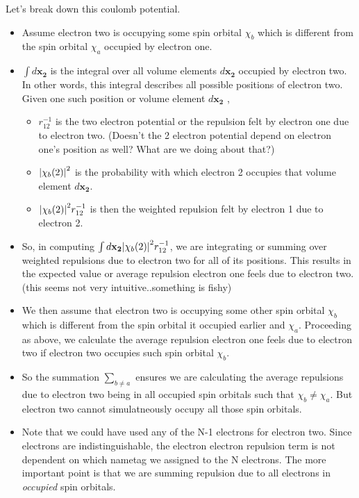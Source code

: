 \documentclass{article}
\begin{document}
        Let's break down this coulomb potential.
        \begin{itemize}
          \item Assume electron two is occupying some spin orbital \(\chi_b\) which is
          different from the spin orbital \(\chi_a\) occupied by electron one.
          \item \(\int d\mathbf{x_2}\) is the integral over all
          volume elements \(d\mathbf{x_2}\) occupied by electron two. In other words,
          this integral describes all possible positions of electron two. Given one
          such position or volume element \(d\mathbf{x_2}\) ,
          \begin{itemize}
            \item \(r_{1 2}^{-1}\) is the two electron potential or the repulsion felt
            by electron one due to electron two. (Doesn't the 2 electron potential
            depend on electron one's position as well? What are we doing about that?)
            \item \(\abs{\chi_b(2)}^2\) is the probability with which electron 2 occupies
            that volume element \(d\mathbf{x_2}\).
            \item \(\abs{\chi_b(2)}^2 r_{1 2}^{-1}\) is then the weighted repulsion felt by
            electron 1 due to electron 2.
          \end{itemize}
          \item So, in computing \(\int d\mathbf{x_2} \abs{\chi_b(2)}^2 r_{1 2}^{-1}\), we are integrating or summing over weighted repulsions due to electron two for all of its positions. This results in the expected value or average
          repulsion electron one feels due to electron two. (this seems not very
          intuitive..something is fishy)
          \item We then assume that electron two is occupying some other spin orbital \(\chi_b\)
          which is different from the spin orbital it occupied earlier and \(\chi_a\).
          Proceeding as above, we calculate the average repulsion electron one feels
          due to electron two if electron two occupies such spin orbital \(\chi_b\).
          \item So the summation \(\sum_{b\neq a}\) ensures we are calculating the average
          repulsions due to electron two being in all occupied spin orbitals such that \(\chi_b\neq\chi_a\). But electron
          two cannot simulatneously occupy all those spin orbitals.
          \item Note that we could have used any of the N-1 electrons for electron two.
          Since electrons are indistinguishable, the electron electron repulsion term
          is not dependent on which nametag we assigned to the N electrons. The more
          important point is that we are summing repulsion due to all electrons in
          \textit{occupied} spin orbitals.
        \end{itemize}
\end{document}
